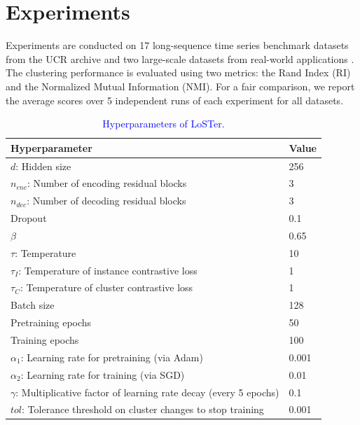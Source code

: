 \documentclass[times, review, 10pt]{elsarticle}
\begin{document}
\section{Experiments}
Experiments are conducted on 17 long-sequence time series benchmark datasets from the UCR archive \cite{dau2019ucr} and two large-scale datasets from real-world applications \cite{makridakis2022m5,huy2023store}. The clustering performance is evaluated using two metrics: the Rand Index (RI) and the Normalized Mutual Information (NMI). For a fair comparison, we report the average scores over 5 independent runs of each experiment for all datasets.

\begin{table}[!htb]
  \caption{\textcolor{blue}{Hyperparameters of LoSTer.}}
  \label{hyperparameters}
  \vskip 0.1in
  \begin{center}
  \begin{small}
  \begin{tabular}{ll}
    \toprule
    Hyperparameter & Value\\
    \midrule
    $d$: Hidden size & 256\\
    $n_{enc}$: Number of encoding residual blocks & 3\\
    $n_{dec}$: Number of decoding residual blocks & 3\\
    Dropout & 0.1\\
    $\beta$ & 0.65\\
    $\tau$: Temperature & 10\\
    $\tau_I$: Temperature of instance contrastive loss & 1\\
    $\tau_C$: Temperature of cluster contrastive loss & 1\\
    Batch size & 128\\
    Pretraining epochs & 50\\
    Training epochs & 100\\
    $\alpha_1$: Learning rate for pretraining (via Adam) & 0.001\\
    $\alpha_2$: Learning rate for training (via SGD) & 0.01\\
    $\gamma$: Multiplicative factor of learning rate decay (every 5 epochs) & 0.1\\
    $tol$: Tolerance threshold on cluster changes to stop training & 0.001\\
    \bottomrule
  \end{tabular}
  \end{small}
  \end{center}
  \vskip -0.1in
\end{table}
\end{document}
